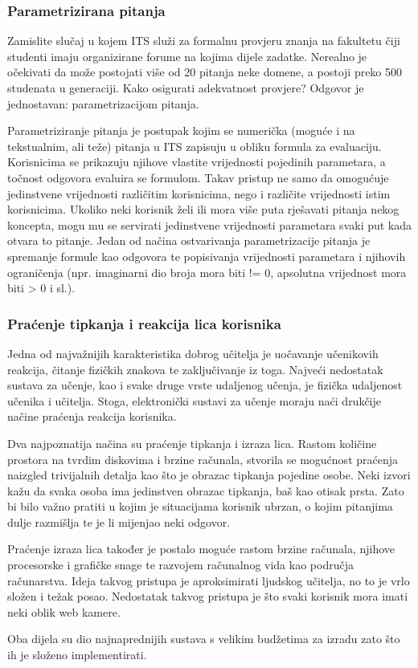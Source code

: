 \documentclass[times, utf8, zavrsni]{fer}
\begin{document}
\subsubsection{Parametrizirana pitanja}
Zamislite slučaj u kojem ITS služi za formalnu provjeru znanja na fakultetu čiji studenti imaju organizirane forume na kojima dijele zadatke. Nerealno je očekivati da može postojati više od 20 pitanja neke domene, a postoji preko 500 studenata u generaciji. Kako osigurati adekvatnost provjere? Odgovor je jednostavan: parametrizacijom pitanja.
\par
Parametriziranje pitanja je postupak kojim se numerička (moguće i na tekstualnim, ali teže) pitanja u ITS zapisuju u obliku formula za evaluaciju. Korisnicima se prikazuju njihove vlastite vrijednosti pojedinih parametara, a točnost odgovora evaluira se formulom. Takav pristup ne samo da omogućuje jedinstvene vrijednosti različitim korisnicima, nego i različite vrijednosti istim korisnicima. Ukoliko neki korisnik želi ili mora više puta rješavati pitanja nekog koncepta, mogu mu se servirati jedinstvene vrijednosti parametara svaki put kada otvara to pitanje. Jedan od načina ostvarivanja parametrizacije pitanja je spremanje formule kao odgovora te popisivanja vrijednosti parametara i njihovih ograničenja (npr. imaginarni dio broja mora biti != 0, apsolutna vrijednost mora biti > 0 i sl.).

\subsubsection{Praćenje tipkanja i reakcija lica korisnika}
Jedna od najvažnijih karakteristika dobrog učitelja je uočavanje učenikovih reakcija, čitanje fizičkih znakova te zaključivanje iz toga. Najveći nedostatak sustava za učenje, kao i svake druge vrste udaljenog učenja, je fizička udaljenost učenika i učitelja. Stoga, elektronički sustavi za učenje moraju naći drukčije načine praćenja reakcija korisnika.
\par
Dva najpoznatija načina su praćenje tipkanja i izraza lica. Rastom količine prostora na tvrdim diskovima i brzine računala, stvorila se mogućnost praćenja naizgled trivijalnih detalja kao što je obrazac tipkanja pojedine osobe. Neki izvori kažu da svaka osoba ima jedinstven obrazac tipkanja, baš kao otisak prsta. Zato bi bilo važno pratiti u kojim je situacijama korisnik ubrzan, o kojim pitanjima dulje razmišlja te je li mijenjao neki odgovor.
\par
Praćenje izraza lica također je postalo moguće rastom brzine računala, njihove procesorske i grafičke snage te razvojem računalnog vida kao područja računarstva. Ideja takvog pristupa je aproksimirati ljudskog učitelja, no to je vrlo složen i težak posao. Nedostatak takvog pristupa je što svaki korisnik mora imati neki oblik web kamere.
\par
Oba dijela su dio najnaprednijih sustava s velikim budžetima za izradu zato što ih je složeno implementirati. 
\end{document}
